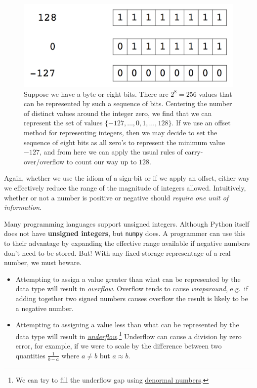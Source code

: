 \documentclass[12pt,letterpaper,twoside]{article}
\begin{document}
\begin{figure}[h]
\centering
\includegraphics[scale=0.5]{fig/sign-offset.png}
\caption{\footnotesize Suppose we have a byte or eight bits. There are $2^8
= 256$ values that can be represented by such a sequence of
bits. Centering the number of distinct values around the integer zero,
we find that we can represent the set of values $\{-127, \ldots, 0, 1,
\ldots, 128\}$. If we use an offset method for representing integers,
then we may decide to set the sequence of eight bits as all zero's to
represent the minimum value $-127$, and from here we can apply the
usual rules of carry-over/overflow to count our way up to $128$.}
\end{figure}

Again, whether we use the idiom of a sign-bit or if we apply an
offset, either way we effectively reduce the range of the magnitude of
integers allowed. Intuitively, whether or not a number is positive or
negative should \emph{require one unit of information}.

Many programming languages support unsigned integers. Although
Python itself does not have \textbf{unsigned integers}, but \texttt{numpy} does.
A programmer can use this to their advantage by expanding the effective range available
if negative numbers don't need to be stored.
But! With any fixed-storage representage of a real number, we must beware.

\begin{itemize}
\item Attempting to assign a value greater than what can be represented by
the data type will result in \href{https://en.wikipedia.org/wiki/Integer_overflow}{\emph{overflow}}.
Overflow tends to cause \emph{wraparound}, e.g.~if adding
together two signed numbers causes overflow the result is likely to be
a negative number.

\item Attempting to assigning a value less than what can be represented by
the data type will result in
\href{https://en.wikipedia.org/wiki/Arithmetic_underflow}{\emph{underflow}}.\footnote{We
  can try to fill the underflow gap using \href{https://en.wikipedia.org/wiki/Denormal_number}{denormal numbers}.}
  Underflow can cause a division by zero error, for example, if we
  were to scale by the difference between two quantities
  $\frac{1}{b-a}$ where $a \neq b$ but $a \approx b$. 
\end{itemize}
\end{document}
